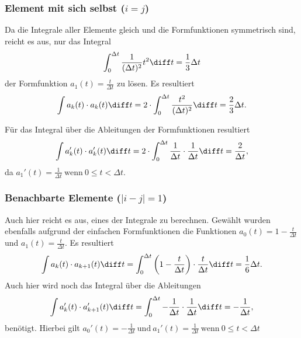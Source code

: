\subsubsection{Element mit sich selbst ($i = j$)} %
Da die Integrale aller Elemente gleich und die Formfunktionen symmetrisch sind, reicht es aus, nur das Integral
\begin{equation}
    \int_{0}^{\Delta t} \frac{1}{(\Delta t)^2} t^2 \diff t = \frac{1}{3} \Delta t
\end{equation}
der Formfunktion $ a_1(t) = \frac{t}{\Delta t} $ zu lösen.
Es resultiert
\begin{equation}
    \int a_k(t) \cdot a_k(t) \diff t = 2 \cdot \int_{0}^{\Delta t} \frac{t^2}{(\Delta t)^2} \diff t = \frac{2}{3} \Delta t.
\end{equation}

Für das Integral über die Ableitungen der Formfunktionen resultiert
\begin{equation}
    \int a_k'(t) \cdot a_k'(t) \diff t = 2 \cdot \int_{0}^{\Delta t} \frac{1}{\Delta t} \cdot \frac{1}{\Delta t} \diff t = \frac{2}{\Delta t},
\end{equation}
da $a_1'(t)= \frac{1}{\Delta t} \ \text{wenn} \ 0 \leq t < \Delta t$.

\subsubsection{Benachbarte Elemente ($|i - j| = 1$)}
Auch hier reicht es aus, eines der Integrale zu berechnen. 
Gewählt wurden ebenfalls aufgrund der einfachen Formfunktionen die Funktionen $a_0(t) = 1 - \frac{t}{\Delta t}$ und $a_1(t) = \frac{t}{\Delta t}$.
Es resultiert
\begin{equation}
    \int a_k(t) \cdot a_{k+1}(t) \diff t = \int_{0}^{\Delta t} \left(1 - \frac{t}{\Delta t}\right) \cdot \frac{t}{\Delta t} \diff t = \frac{1}{6} \Delta t.
\end{equation}
Auch hier wird noch das Integral über die Ableitungen 
\begin{equation}
    \int a_k'(t) \cdot a_{k+1}'(t) \diff t = \int_{0}^{\Delta t} -\frac{1}{\Delta t} \cdot \frac{1}{\Delta t} \diff t = -\frac{1}{\Delta t},
\end{equation}
benötigt.
Hierbei gilt $a_0'(t)= -\frac{1}{\Delta t} \ \text{und} \ a_1'(t)= \frac{1}{\Delta t} \ \text{wenn} \ 0 \leq t < \Delta t$

